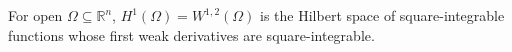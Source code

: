 
For open $\Omega\subseteq\mathbb R^n$, $H^1(\Omega)=W^{1,2}(\Omega)$ is the Hilbert space of square-integrable functions whose first weak derivatives are square-integrable.

